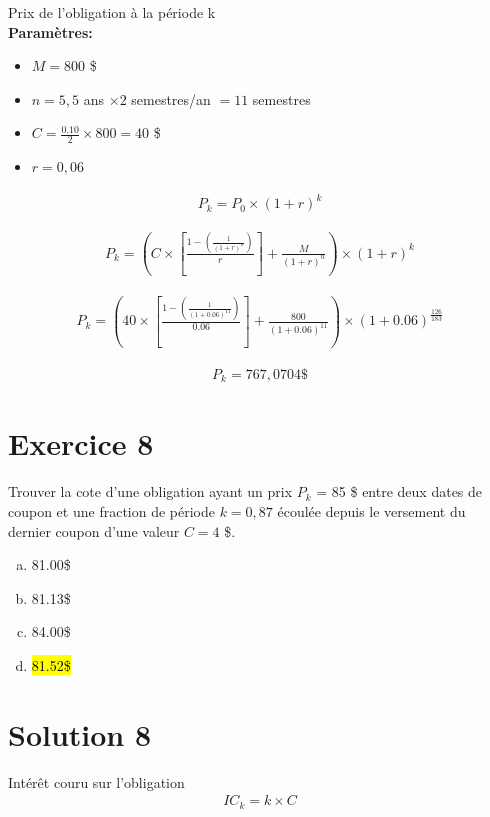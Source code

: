 \documentclass[10pt,a4paper]{article}
\begin{document}
Prix de l'obligation à la période k \\

\textbf{Paramètres:}
\begin{itemize}
\item $M = 800$ \$
\item $n = 5,5$ ans $\times 2$ semestres/an $= 11$ semestres
\item $C = \frac{0.10}{2} \times 800 = 40$ \$
\item $r = 0,06$
\end{itemize}

\begin{align*}
P_k=P_0 \times (1+r)^k
\end{align*}

\begin{align*}
P_k= \left( C \times \left[\frac{1-\left( \frac{1}{(1+r)^n}\right)}{r} \right] +\frac{M}{(1+r)^n} \right) \times (1+r)^k
\end{align*}

\begin{align*}
P_k= \left( 40 \times \left[\frac{1-\left( \frac{1}{(1+0.06)^{11}}\right)}{0.06} \right] +\frac{800}{(1+0.06)^{11}} \right) \times (1+0.06)^{\frac{126}{183}}
\end{align*}

\begin{align*}
P_k = 767,0704 \$
\end{align*}

\newpage

\section*{Exercice 8}
Trouver la cote d'une obligation ayant un prix $P_k$ = 85 \$ entre deux dates de coupon et une fraction de période $k = 0,87$ écoulée depuis le versement du dernier coupon d'une valeur $C = 4$ \$.

\begin{enumerate}[a)]
\item 81.00\$
\item 81.13\$
\item 84.00\$
\item \hl{81.52\$}
\end{enumerate}

\section*{Solution 8}

Intérêt couru sur l'obligation
\begin{align*}
IC_k = k \times C
\end{align*}
\end{document}
